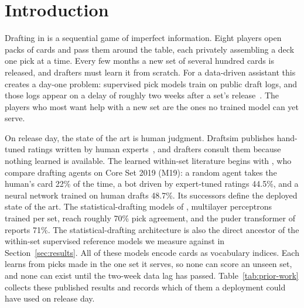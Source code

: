 \section{Introduction}
\label{sec:intro}

Drafting in \mtg{} is a sequential game of imperfect information. Eight
players open packs of cards and pass them around the table, each privately
assembling a deck one pick at a time. Every few months a new set of several
hundred cards is released, and drafters must learn it from scratch. For a
data-driven assistant this creates a day-one problem: supervised pick
models train on public draft logs, and those logs appear on a delay of
roughly two weeks after a set's release~\citep{brooks2024statistical}. The
players who most want help with a new set are the ones no trained model can
yet serve.

On release day, the state of the art is human judgment. Draftsim publishes
hand-tuned ratings written by human experts~\citep{draftsimratings}, and
drafters consult them because nothing learned is available. The learned
within-set literature begins with \citet{ward2021drafting}, who compare
drafting agents on Core Set 2019 (M19): a random agent takes the human's
card 22\% of the time, a bot driven by expert-tuned ratings 44.5\%, and a
neural network trained on human drafts 48.7\%. Its successors define the
deployed state of the art. The statistical-drafting models of
\citet{brooks2024statistical}, multilayer perceptrons trained per set,
reach roughly 70\% pick agreement, and the puder transformer of
\citet{czerner2025puder} reports 71\%. The statistical-drafting
architecture is also the direct ancestor of the within-set supervised reference models we
measure against in Section~\ref{sec:results}. All of these models encode
cards as vocabulary indices. Each learns from picks made in the one set it
serves, so none can score an unseen set, and none can exist until the
two-week data lag has passed. Table~\ref{tab:prior-work} collects these
published results and records which of them a deployment could have used
on release day.

\begin{table}[t]
\centering
\caption{Published pick-agreement results for \mtg{} drafting, and whether
each approach can score a previously unseen set using only information
available on release day. The table closes with this paper's frozen
Marvel Super Heroes (MSH) result. An asterisk marks a caveat: the method
uses post-release information, or possible pretraining exposure to
post-release discussion cannot be ruled out.}
\label{tab:prior-work}
\footnotesize
\setlength{\tabcolsep}{3.5pt}

\end{table}

